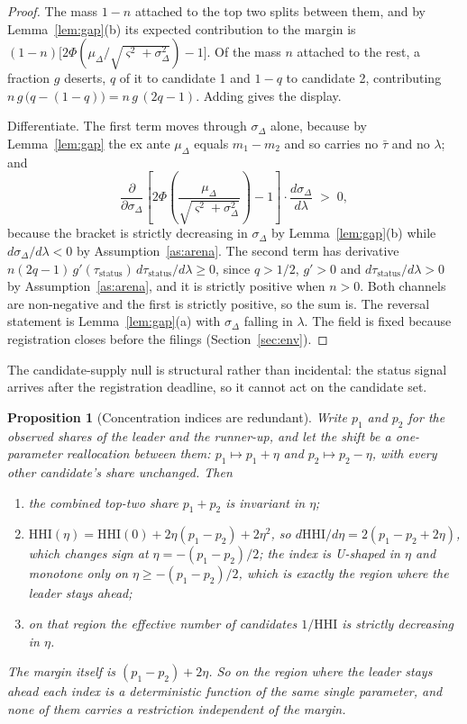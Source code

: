 \documentclass[11pt]{article}
\newtheorem{proposition}{Proposition}
\theoremstyle{definition}
\theoremstyle{remark}
\begin{document}
\begin{proof}
The mass $1-n$ attached to the top two splits between them, and by
Lemma~\ref{lem:gap}(b) its expected contribution to the margin is
$(1-n)\bigl[2\Phi(\mu_\Delta/\sqrt{\varsigma^2+\sigma^2_\Delta}) - 1\bigr]$.
Of the mass $n$ attached to the rest, a fraction $g$ deserts, $q$ of it to
candidate 1 and $1-q$ to candidate 2, contributing
$n\,g\,\bigl(q - (1-q)\bigr) = n\,g\,(2q-1)$. Adding gives the display.

Differentiate. The first term moves through $\sigma_\Delta$ alone, because by
Lemma~\ref{lem:gap} the ex ante $\mu_\Delta$ equals $m_1 - m_2$ and so carries
no $\bar\tau$ and no $\lambda$; and
\[
  \frac{\partial}{\partial \sigma_\Delta}
  \left[2\Phi\!\left(\frac{\mu_\Delta}
      {\sqrt{\varsigma^2+\sigma^2_\Delta}}\right)-1\right]
  \cdot \frac{d\sigma_\Delta}{d\lambda} \;>\; 0,
\]
because the bracket is strictly decreasing in $\sigma_\Delta$ by
Lemma~\ref{lem:gap}(b) while $d\sigma_\Delta/d\lambda < 0$ by
Assumption~\ref{as:arena}. The second term has derivative
$n(2q-1)\,g'(\tau_{\mathrm{status}})\,
 d\tau_{\mathrm{status}}/d\lambda \ge 0$, since $q > 1/2$, $g' > 0$ and
$d\tau_{\mathrm{status}}/d\lambda > 0$ by Assumption~\ref{as:arena}, and it
is strictly positive when $n > 0$. Both channels are non-negative and the
first is strictly positive, so the sum is. The reversal statement is
Lemma~\ref{lem:gap}(a) with $\sigma_\Delta$ falling in $\lambda$. The field is
fixed because registration closes before the filings (Section~\ref{sec:env}).
\end{proof}

The candidate-supply null is structural rather than incidental: the status
signal arrives after the registration deadline, so it cannot act on the
candidate set.

\begin{proposition}[Concentration indices are redundant]
\label{prop:concentration}
Write $p_1$ and $p_2$ for the observed shares of the leader and the runner-up,
and let the shift be a one-parameter reallocation between them:
$p_1 \mapsto p_1 + \eta$ and $p_2 \mapsto p_2 - \eta$, with every other
candidate's share unchanged. Then
\begin{enumerate}
\item[(i)] the combined top-two share $p_1 + p_2$ is \emph{invariant} in
      $\eta$;
\item[(ii)] $\mathrm{HHI}(\eta) = \mathrm{HHI}(0) + 2\eta(p_1-p_2) + 2\eta^2$,
      so $d\mathrm{HHI}/d\eta = 2(p_1 - p_2 + 2\eta)$, which changes sign at
      $\eta = -(p_1-p_2)/2$; the index is U-shaped in $\eta$ and monotone only
      on $\eta \ge -(p_1-p_2)/2$, which is exactly the region where the leader
      stays ahead;
\item[(iii)] on that region the effective number of candidates
      $1/\mathrm{HHI}$ is strictly decreasing in $\eta$.
\end{enumerate}
The margin itself is $(p_1-p_2) + 2\eta$. So on the region where the leader
stays ahead each index is a deterministic function of the same single
parameter, and none of them carries a restriction independent of the margin.
\end{proposition}
\end{document}
